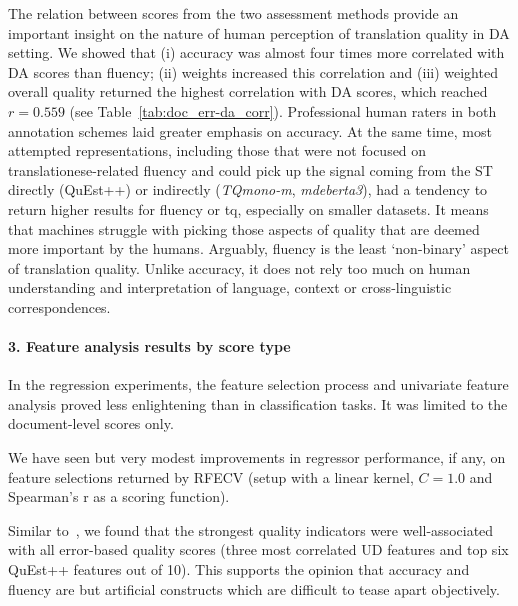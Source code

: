The relation between scores from the two assessment methods provide an important insight on the nature of human perception of translation quality in DA setting. We showed that (i) accuracy was almost four times more correlated with DA scores than fluency; (ii) weights increased this correlation and (iii) weighted overall quality returned the highest correlation with DA scores, which reached $r=0.559$ (see Table~\ref{tab:doc_err-da_corr}). Professional human raters in both annotation schemes laid greater emphasis on accuracy. 
At the same time, most attempted representations, including those that were not focused on translationese-related fluency and could pick up the signal coming from the ST directly (QuEst++) or indirectly (\textit{TQmono-m}, \textit{mdeberta3}), had a tendency to return higher results for fluency or tq, especially on smaller datasets. It means that machines struggle with picking those aspects of quality that are deemed more important by the humans. Arguably, fluency is the least `non-binary' aspect of translation quality. Unlike accuracy, it does not rely too much on human understanding and interpretation of language, context or cross-linguistic correspondences. 

\paragraph{3. Feature analysis results by score type}
In the regression experiments, the feature selection process and univariate feature analysis proved less enlightening than in classification tasks. It was limited to the document-level scores only.

We have seen but very modest improvements in regressor performance, if any, on feature selections returned by \gls{RFECV} (setup with a linear kernel, $C=1.0$ and Spearman's r as a scoring function).  

Similar to~\cite{Yuan2018}, we found that the strongest quality indicators were well-associated with all error-based quality scores (three most correlated UD features and top six QuEst++ features out of 10). 
This supports the opinion that accuracy and fluency are but artificial constructs which are difficult to tease apart objectively. %

